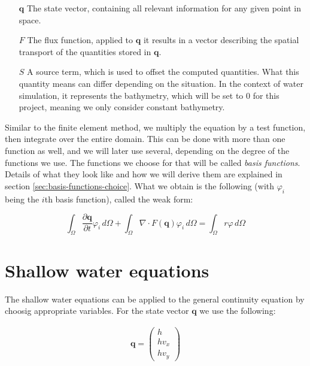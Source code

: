\documentclass{article}
\newcommand{\pd}[2]{\dfrac{\partial #1}{\partial #2}}
\renewcommand{\phi}{\varphi}
\begin{document}
\begin{itemize}
\item[$\mathbf{q}$] The state vector, containing all relevant information for any given point in space.
\item[$F$] The flux function, applied to $\mathbf{q}$ it results in a vector describing the spatial transport of the quantities stored in $\mathbf{q}$.
\item[$S$] A source term, which is used to offset the computed quantities. What this quantity means can differ depending on the situation. In the context of water simulation, it represents the bathymetry, which will be set to 0 for this project, meaning we only consider constant bathymetry.
\end{itemize}

Similar to the finite element method, we multiply the equation by a test function, then integrate over the entire domain. This can be done with more than one function as well, and we will later use several, depending on the degree of the functions we use. The functions we choose for that will be called \emph{basis functions}. Details of what they look like and how we will derive them are explained in section \ref{sec:basis-functions-choice}. What we obtain is the following (with $\phi_i$ being the $i$th basis function), called the weak form:

\begin{equation}
  \label{eq:general-continuity-equation-discontinuous-galerkin}
  \int_\Omega \pd{\mathbf{q}}{t} \phi_i \,d\Omega + \int_\Omega \nabla \cdot F(\mathbf{q}) \phi_i \,d\Omega = \int_\Omega r \phi \,d\Omega
\end{equation}

\section{Shallow water equations}
\label{sec:shallow-water-equations}

The shallow water equations can be applied to the general continuity equation by choosig appropriate variables. For the state vector $\mathbf{q}$ we use the following:

\begin{eqnarray*}
  \mathbf{q} =
  \begin{pmatrix}
    h \\ h v_x \\ h v_y
  \end{pmatrix}
\end{eqnarray*}
\end{document}
